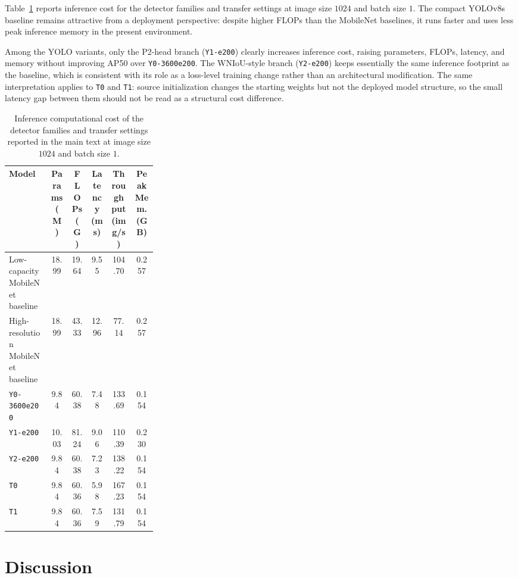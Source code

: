 \documentclass[journal,article,submit,moreauthors,pdftex]{Definitions/tsp}
\begin{document}
Table~\ref{tab:efficiency} reports inference cost for the detector families and transfer settings at image size $1024$ and batch size $1$. The compact YOLOv8s baseline remains attractive from a deployment perspective: despite higher FLOPs than the MobileNet baselines, it runs faster and uses less peak inference memory in the present environment.

Among the YOLO variants, only the P2-head branch (\texttt{Y1-e200}) clearly increases inference cost, raising parameters, FLOPs, latency, and memory without improving AP50 over \texttt{Y0-3600e200}. The WNIoU-style branch (\texttt{Y2-e200}) keeps essentially the same inference footprint as the baseline, which is consistent with its role as a loss-level training change rather than an architectural modification. The same interpretation applies to \texttt{T0} and \texttt{T1}: source initialization changes the starting weights but not the deployed model structure, so the small latency gap between them should not be read as a structural cost difference.

\begin{table}[t]
  \centering
  \caption{Inference computational cost of the detector families and transfer settings reported in the main text at image size $1024$ and batch size $1$.}
  \label{tab:efficiency}
  \footnotesize
  \setlength{\tabcolsep}{4pt}
  \begin{tabularx}{\linewidth}{>{\raggedright\arraybackslash}p{0.29\linewidth} c c c c c}
    \toprule
    Model & Params (M) & FLOPs (G) & Latency (ms) & Throughput (img/s) & Peak Mem. (GB) \\
    \midrule
    Low-capacity MobileNet baseline & 18.99 & 19.64 & 9.55 & 104.70 & 0.257 \\
    High-resolution MobileNet baseline & 18.99 & 43.33 & 12.96 & 77.14 & 0.257 \\
    \texttt{Y0-3600e200} & 9.84 & 60.38 & 7.48 & 133.69 & 0.154 \\
    \texttt{Y1-e200} & 10.03 & 81.24 & 9.06 & 110.39 & 0.230 \\
    \texttt{Y2-e200} & 9.84 & 60.38 & 7.23 & 138.22 & 0.154 \\
    \texttt{T0} & 9.84 & 60.36 & 5.98 & 167.23 & 0.154 \\
    \texttt{T1} & 9.84 & 60.36 & 7.59 & 131.79 & 0.154 \\
    \bottomrule
  \end{tabularx}
\end{table}

\section{Discussion}
\label{sec:discussion}
\end{document}
